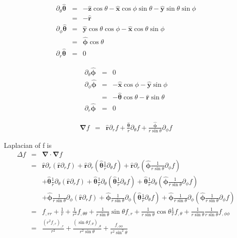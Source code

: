 \documentclass[12pt,a4paper]{article}
\begin{document}
\begin{enumerate}
\begin{eqnarray*}
	\partial_\theta \bm{\hat \theta} &=& -\bm{\hat z} \cos\theta - \bm{\hat x} \cos\phi \sin\theta - \bm{\hat y} \sin\theta \sin\phi \\
	&=& - \bm{\hat r} \\
	\partial_\phi \bm{\hat \theta} &=& \bm{\hat y} \cos\theta \cos\phi - \bm{\hat x}\cos\theta \sin\phi \\
	&=& \bm{\hat \phi}\cos\theta \\
	\partial_r \bm{\hat \theta} &=& 0
\end{eqnarray*}

\begin{eqnarray*}
	\partial_\theta \bm{\hat \phi} &=& 0 \\
	\partial_\phi \bm{\hat \phi} &=& -\bm{\hat x} \cos\phi - \bm{\hat y}\sin\phi \\
	&=& -\bm{\hat \theta}\cos\theta -\bm{\hat r}\sin\theta  \\
	\partial_r \bm{\hat \phi} &=& 0
\end{eqnarray*}


\begin{eqnarray*}
	\bm \nabla f &=& \bm{\hat r} \partial_r f + \frac{\bm{\hat \theta} }{r} \partial_\theta f + \frac{\bm{\hat \phi}}{r\sin\theta} \partial_\phi f
\end{eqnarray*}


Laplacian of f is
\begin{eqnarray*}
	\Delta f &=& \bm \nabla \cdot \bm \nabla f \\
	&=& \bm{\hat r} \partial_r \left( \bm{\hat r} \partial_r f\right) + \bm{\hat r}\partial_r \left(\bm{\hat \theta} \frac{1}{r}\partial_\theta f \right) + \bm{\hat r} \partial_r \left( \bm{\hat \phi}\frac{1}{r\sin\theta}\partial_\phi f \right) \\
	&& +  \bm{\hat\theta}\frac{1}{r}\partial_\theta \left( \bm{\hat r} \partial_r f \right) + \bm{\hat \theta} \frac{1}{r}\partial_\theta \left( \bm{\hat \theta}\frac{1}{r}\partial_\theta f \right) + \bm{\hat \theta} \frac 1 r \partial_\theta  \left( \bm{\hat \phi} \frac{1}{r\sin\theta}\partial_\phi f \right) \\
	&& + \bm{\hat \phi} \frac{1}{r\sin\theta}\partial_\phi \left( \bm{\hat r} \partial_r f  \right) + \bm{\hat \phi} \frac{1}{r\sin\theta}\partial_\phi \left( \bm{\hat \theta} \frac 1 r \partial_\theta f \right) + \bm{\hat \phi} \frac{1}{r\sin\theta}\partial_\phi \left( \bm{\hat \phi} \frac{1}{r\sin\theta} \partial_\phi f \right) \\
	&=& f_{,rr} + \frac{1}{r} + \frac{1}{r^2} f_{,\theta\theta} + \frac{1}{r\sin\theta} \sin\theta f_{,r} + \frac{1}{r\sin\theta} \cos\theta \frac{1}{r} f_{,\theta} + \frac{1}{r\sin\theta}\frac{1}{r\sin\theta}  f_{,\phi\phi} \\
	&=& \frac{(r^2 f_{,r})_{,r}}{r^2} + \frac{(\sin\theta f_{,\theta})_{,\theta}}{r^2\sin\theta} + \frac{f_{,\phi\phi}}{r^2\sin^2\theta}
\end{eqnarray*}





\end{enumerate}
\end{document}
